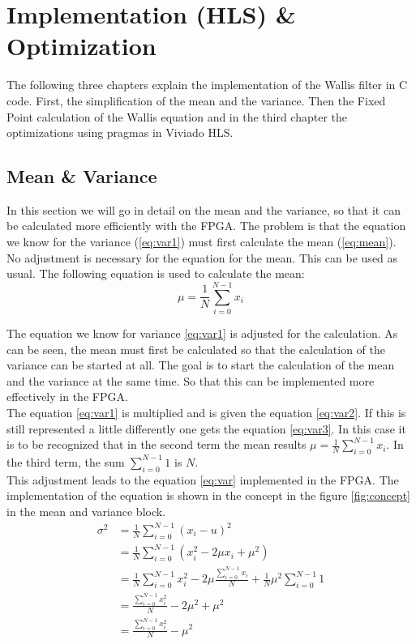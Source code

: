 \section{Implementation (HLS) \& Optimization}
The following three chapters explain the implementation of the Wallis filter in C code. First, the simplification of the mean and the variance. Then the Fixed Point calculation of the Wallis equation and in the third chapter the optimizations using pragmas in Viviado HLS.

\subsection{Mean \& Variance}
In this section we will go in detail on the mean and the variance, so that it can be calculated more efficiently with the FPGA. The problem is that the equation we know for the variance (\ref{eq:var1}) must first calculate the mean (\ref{eq:mean}). \\
No adjustment is necessary for the equation for the mean. This can be used as usual. The following equation	is used to calculate the mean:
\begin{equation}
    \mu = \frac{1}{N} \sum_{i = 0}^{N - 1} x_{i}
    \label{eq:mean}
\end{equation} 

The equation we know for variance \ref{eq:var1} is adjusted for the calculation. As can be seen, the mean must first be calculated so that the calculation of the variance can be started at all. The goal is to start the calculation of the mean and the variance at the same time. So that this can be implemented more effectively in the FPGA. \\
The equation \ref{eq:var1} is multiplied and is given the equation \ref{eq:var2}. If this is still represented a little differently one gets the equation \ref{eq:var3}. In this case it is to be recognized that in the second term the mean results $\mu = \frac{1}{N} \sum_{i = 0}^{N - 1} x_{i}$. In the third term, the sum $\sum_{i = 0}^{N - 1} 1$ is $N$. \\
This adjustment leads to the equation \ref{eq:var} implemented in the FPGA. The implementation of the equation is shown in the concept in the figure \ref{fig:concept} in the mean and variance block.
\begin{align}
    \sigma^{2} & = \frac{1}{N} \sum_{i = 0}^{N - 1} (x_{i} - u)^{2} \label{eq:var1}\\ 
    		& = \frac{1}{N} \sum_{i = 0}^{N - 1} (x_{i}^{2} - 2 \mu x_{i} + \mu^{2})  \label{eq:var2}\\
    		& = \frac{1}{N} \sum_{i = 0}^{N - 1} x_{i}^{2} - 2\mu \frac{\sum_{i = 0}^{N - 1} x_{i}}{N} + \frac{1}{N} \mu^{2} \sum_{i = 0}^{N - 1} 1 \label{eq:var3}\\
    		& = \frac{\sum_{i = 0}^{N - 1} x_{i}^{2}}{N}  - 2\mu^{2} + \mu^{2} \label{eq:var4}\\
    		& = \frac{\sum_{i = 0}^{N - 1} x_{i}^{2}}{N}  - \mu^{2}
    \label{eq:var}
\end{align}

